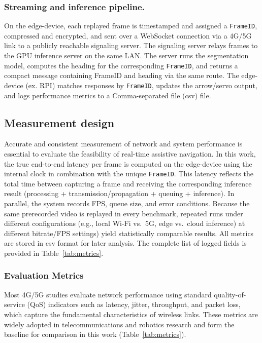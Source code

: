 \documentclass{ieeeaccess}
\begin{document}
\subsubsection{Streaming and inference pipeline.}
On the edge-device, each replayed frame is timestamped and assigned a \texttt{FrameID}, compressed and encrypted, and sent over a WebSocket connection via a 4G/5G link to a publicly reachable signaling server. The signaling server relays frames to the GPU inference server on the same LAN. The server runs the segmentation model, computes the heading for the corresponding \texttt{FrameID}, and returns a compact message containing FrameID and heading via the same route. The edge-device (ex. RPI) matches responses by \texttt{FrameID}, updates the arrow/servo output, and logs performance metrics to a Comma-separated file (csv) file.

\subsection{Measurement design}

Accurate and consistent measurement of network and system performance is essential to evaluate the feasibility of real-time assistive navigation. In this work, the true end-to-end latency per frame is computed on the edge-device using the internal clock in combination with the unique \texttt{FrameID}. This latency reflects the total time between capturing a frame and receiving the corresponding inference result (processing + transmission/propagation + queuing + inference). In parallel, the system records FPS, queue size, and error conditions. Because the same prerecorded video is replayed in every benchmark, repeated runs under different configurations (e.g., local Wi-Fi vs.\ 5G, edge vs.\ cloud inference) at different bitrate/FPS settings) yield statistically comparable results. All metrics are stored in csv format for later analysis. The complete list of logged fields is provided in Table~\ref{tab:metrics}.

\subsubsection{Evaluation Metrics}

Most 4G/5G studies evaluate network performance using standard quality-of-service (QoS) indicators such as latency, jitter, throughput, and packet loss, which capture the fundamental characteristics of wireless links. These metrics are widely adopted in telecommunications and robotics research and form the baseline for comparison in this work (Table~\ref{tab:metrics}).
\end{document}
